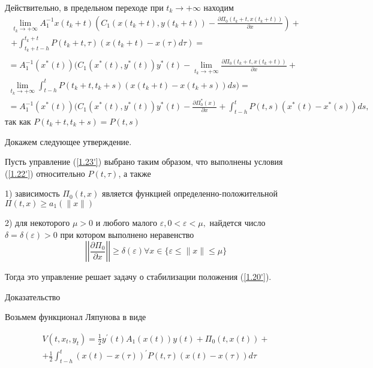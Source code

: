 Действительно, в предельном переходе при $t_k \to + \infty$ находим 
$$
\begin{array}{c}
\displaystyle \lim_{t_k \to + \infty} A_1^{-1} x(t_k + t) (C_1 (x(t_k + t), y(t_k + t)) - \frac{\partial \Pi_0 (t_k + t, x(t_k + t))}{\partial x})+\\
\displaystyle + \int_{t_k+t-h}^{t_k+t} P(t_k + t, \tau) (x(t_k + t) - x(\tau) d \tau)=\\
\end{array}
$$
$$
\begin{array}{c}
\displaystyle = A_1^{-1} (x^{*} (t)) (C_1 (x^{*}(t), y^{*}(t)) y^{*}(t) - \lim_{t_k \to + \infty} \frac{\partial \Pi_0 (t_k +t, x (t_k + t))}{\partial x} +\\
\displaystyle \lim_{t_k \to + \infty} \int_{t - h}^{t} P(t_k + t, t_k + s) ( x(t_k + t) - x(t_k + s)) ds) =\\
\displaystyle =A_1^{-1} ( x^{*} (t)) (C_1 (x^{*} (t), y^{*}(t)) y^{*} (t) - \frac{\partial \Pi_0^{*} (x)}{\partial x} + \int_{t - h}^{t} P (t, s) (x^{*} (t) - x^{*} (s)) ds,
\end{array}
$$
так как $P(t_k + t, t_k + s) = P(t, s)$

Докажем следующее утверждение. 

\begin{theorem} \label{1.6'}
Пусть управление (\ref{1.23'}) выбрано таким образом, что выполнены условия (\ref{1.22'}) относительно $P(t, \tau)$, а также 

1) зависимость $\Pi_0 (t, x)$ является функцией определенно-положительной $\Pi (t, x) \ge a_1 (\| x \|)$

 2) для некоторого $\mu > 0$ и любого малого $\varepsilon, 0 < \varepsilon < \mu, $ найдется число $\delta = \delta (\varepsilon) > 0$ при котором выполнено неравенство $$\left| \left| \frac{\partial \Pi_0}{\partial x} \right| \right| \ge \delta (\varepsilon) \forall x \in \lbrace \varepsilon \le \| x \| \le \mu \rbrace$$

Тогда это управление решает задачу о стабилизации положения (\ref{1.20'}).
\end{theorem}

Доказательство

Возьмем функционал Ляпунова в виде 

\begin{equation} \label{1.26'}
	\begin{array}{c}
		\displaystyle V(t, x_t, y_t) = \frac12 y^{'} (t) A_1(x(t)) y(t) + \Pi_0(t, x(t)) +\\
		\displaystyle + \frac12 \int_{t-h}^{t} (x(t) - x(\tau))^{'} P(t, \tau) (x(t) - x (\tau)) d \tau
	\end{array}
\end{equation}


